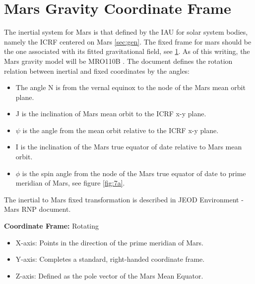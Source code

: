 
\section{Mars Gravity Coordinate Frame} \label{sec:Marsg} 
The inertial system for Mars is that defined by the IAU for solar system bodies, namely the ICRF centered on Mars \ref{sec:gen}.
The fixed frame for mars should be the one associated with its fitted gravitational field, see \ref{sec:Marsg}. As of this writing, the Mars gravity model will be MRO110B \cite{2011Icar}.
The document \cite{2006Icar} defines the rotation relation between inertial and fixed coordinates by the angles:
\begin{itemize}
\item The angle N is from the vernal equinox to the node of the Mars mean orbit plane.
\item J is the inclination of Mars mean orbit to the ICRF x-y plane.
\item $\psi$ is the angle from the mean orbit relative to the ICRF x-y plane.
\item I is the inclination of the Mars true equator of date relative to Mars mean orbit.
\item $\phi$ is the spin angle from the node of the Mars true equator of date to prime meridian of Mars, see figure \ref{fig:7a}. 
\end{itemize}

The inertial to Mars fixed transformation is described in JEOD Environment - Mars RNP document.

\textbf{Coordinate Frame: } Rotating 

\begin{itemize}
\item X-axis: Points in the direction of the prime meridian of Mars.
\item Y-axis: Completes a standard, right-handed coordinate frame.
\item Z-axis: Defined as the pole vector of the Mars Mean Equator.
\end{itemize}

